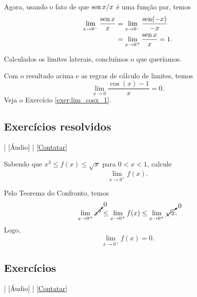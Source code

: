 Agora, usando o fato de que $\operatorname{sen} x/x$ é uma função par, temos
\begin{align}
  \lim_{x\to 0^-} \frac{\operatorname{sen} x}{x} &= \lim_{x\to 0^-} \frac{\operatorname{sen}(-x)}{-x} \\
  &= \lim_{x\to 0^+} \frac{\operatorname{sen} x}{x} = 1.
\end{align}

Calculados os limites laterais, concluímos o que queríamos.

\begin{ex}
  Com o resultado acima e as regras de cálculo de limites, temos
  \begin{equation}
    \lim_{x\to 0} \frac{\cos(x) - 1}{x} = 0.
  \end{equation}
  Veja o Exercício \ref{exer:lim_cosx_1}.
\end{ex}

\subsection*{Exercícios resolvidos}

\begin{flushright}
  [Vídeo] | [Áudio] | \href{https://phkonzen.github.io/notas/contato.html}{[Contatar]}
\end{flushright}

\begin{exeresol}
  Sabendo que $x^3 \leq f(x) \leq \sqrt{x}$ para $0 < x < 1$, calcule
  \begin{equation}
    \lim_{x\to 0^+} f(x).
  \end{equation}
\end{exeresol}
\begin{resol}
  Pelo Teorema do Confronto, temos
  \begin{equation}
    \lim_{x\to 0^+} \cancelto{0}{x^3} \leq \lim_{x\to 0^+} f(x) \leq \lim_{x\to 0^+} \cancelto{0}{\sqrt{x}}.
  \end{equation}
  Logo,
  \begin{equation}
    \lim_{x\to 0^+} f(x) = 0.
  \end{equation}
\end{resol}

\emconstrucao

\subsection*{Exercícios}

\begin{flushright}
  [Vídeo] | [Áudio] | \href{https://phkonzen.github.io/notas/contato.html}{[Contatar]}
\end{flushright}

